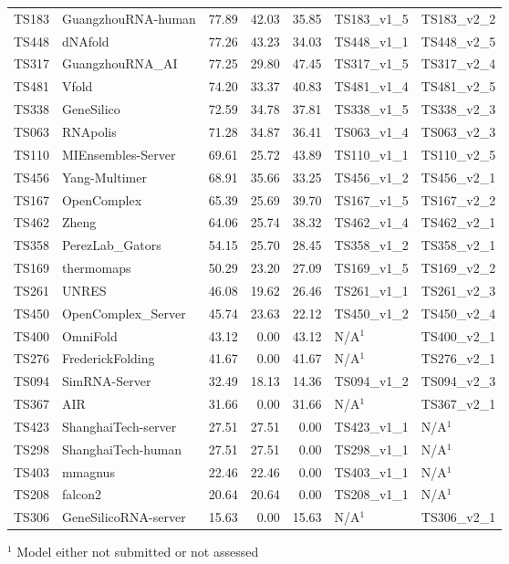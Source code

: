 \begin{table}[ht]
{\begin{tabular}{llrrrll}
TS183 & GuangzhouRNA-human & 77.89 & 42.03 & 35.85 & TS183\_v1\_5 & TS183\_v2\_2 \\ 
TS448 & dNAfold & 77.26 & 43.23 & 34.03 & TS448\_v1\_1 & TS448\_v2\_5 \\ 
TS317 & GuangzhouRNA\_AI & 77.25 & 29.80 & 47.45 & TS317\_v1\_5 & TS317\_v2\_4 \\ 
TS481 & Vfold & 74.20 & 33.37 & 40.83 & TS481\_v1\_4 & TS481\_v2\_5 \\ 
TS338 & GeneSilico & 72.59 & 34.78 & 37.81 & TS338\_v1\_5 & TS338\_v2\_3 \\ 
TS063 & RNApolis & 71.28 & 34.87 & 36.41 & TS063\_v1\_4 & TS063\_v2\_3 \\ 
TS110 & MIEnsembles-Server & 69.61 & 25.72 & 43.89 & TS110\_v1\_1 & TS110\_v2\_5 \\ 
TS456 & Yang-Multimer & 68.91 & 35.66 & 33.25 & TS456\_v1\_2 & TS456\_v2\_1 \\ 
TS167 & OpenComplex & 65.39 & 25.69 & 39.70 & TS167\_v1\_5 & TS167\_v2\_2 \\ 
TS462 & Zheng & 64.06 & 25.74 & 38.32 & TS462\_v1\_4 & TS462\_v2\_1 \\ 
TS358 & PerezLab\_Gators & 54.15 & 25.70 & 28.45 & TS358\_v1\_2 & TS358\_v2\_1 \\ 
TS169 & thermomaps & 50.29 & 23.20 & 27.09 & TS169\_v1\_5 & TS169\_v2\_2 \\ 
TS261 & UNRES & 46.08 & 19.62 & 26.46 & TS261\_v1\_1 & TS261\_v2\_3 \\ 
TS450 & OpenComplex\_Server & 45.74 & 23.63 & 22.12 & TS450\_v1\_2 & TS450\_v2\_4 \\ 
TS400 & OmniFold & 43.12 & 0.00 & 43.12 & N/A$^{1}$ & TS400\_v2\_1 \\ 
TS276 & FrederickFolding & 41.67 & 0.00 & 41.67 & N/A$^{1}$ & TS276\_v2\_1 \\ 
TS094 & SimRNA-Server & 32.49 & 18.13 & 14.36 & TS094\_v1\_2 & TS094\_v2\_3 \\ 
TS367 & AIR & 31.66 & 0.00 & 31.66 & N/A$^{1}$ & TS367\_v2\_1 \\ 
TS423 & ShanghaiTech-server & 27.51 & 27.51 & 0.00 & TS423\_v1\_1 & N/A$^{1}$ \\ 
TS298 & ShanghaiTech-human & 27.51 & 27.51 & 0.00 & TS298\_v1\_1 & N/A$^{1}$ \\ 
TS403 & mmagnus & 22.46 & 22.46 & 0.00 & TS403\_v1\_1 & N/A$^{1}$ \\ 
TS208 & falcon2 & 20.64 & 20.64 & 0.00 & TS208\_v1\_1 & N/A$^{1}$ \\ 
TS306 & GeneSilicoRNA-server & 15.63 & 0.00 & 15.63 & N/A$^{1}$ & TS306\_v2\_1 \\ 
\bottomrule
\end{tabular}%
}
\begin{flushleft}\footnotesize $^{1}$ Model either not submitted or not assessed\end{flushleft}
\end{table}
